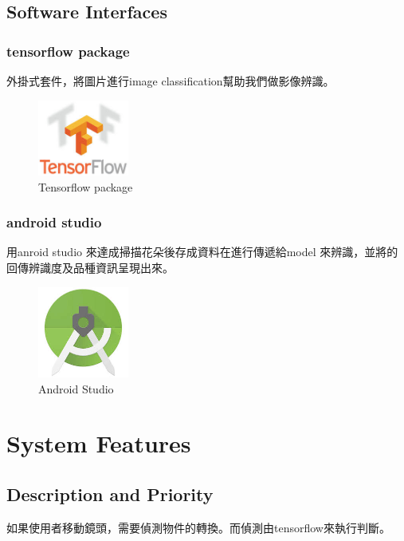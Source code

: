 \documentclass{scrreprt}
\begin{document}
\section{Software Interfaces}
\subsection {tensorflow package}  
\begin{CJK}{UTF8}{bkai}
		外掛式套件，將圖片進行image classification幫助我們做影像辨識。
\end{CJK}
\begin{figure}[h]
\begin{center}
\includegraphics[width=3cm]{tensorflow.jpg}
\end{center}
\caption{Tensorflow package}
\end{figure}
	
\subsection {android studio}
\begin{CJK}{UTF8}{bkai}
		用anroid studio 來達成掃描花朵後存成資料在進行傳遞給model 來辨識，並將的回傳辨識度及品種資訊呈現出來。
\end{CJK}
\begin{figure}[h]
\begin{center}
\includegraphics[width=3cm]{androidstudioicon.jpg}
\end{center}
\caption{Android Studio}
\end{figure}


\chapter{System Features}

\section{Description and Priority}
\begin{CJK}{UTF8}{bkai}
		如果使用者移動鏡頭，需要偵測物件的轉換。而偵測由tensorflow來執行判斷。
\end{CJK}
\end{document}
